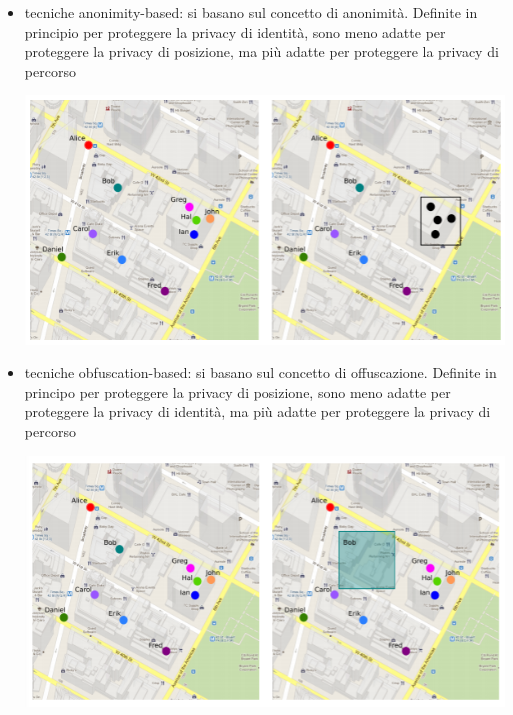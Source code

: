 \begin{itemize}
    \item tecniche anonimity-based: si basano sul concetto di anonimità. Definite in principio per proteggere la privacy di identità, sono meno adatte per proteggere la privacy di posizione, ma più adatte per proteggere la privacy di percorso
    \begin{center}
    \includegraphics[scale=0.7]{img/anonloc.png}
    \end{center}
    
    \item tecniche obfuscation-based: si basano sul concetto di offuscazione. Definite in principo per proteggere la privacy di posizione, sono meno adatte per proteggere la privacy di identità, ma più adatte per proteggere la privacy di percorso
    \begin{center}
    \includegraphics[scale=0.7]{img/obfusloc.png}
    \end{center}
    

\end{itemize}

